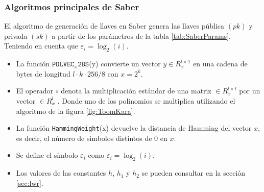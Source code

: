 \subsubsection{Algoritmos principales de Saber \cite{saber-spec-2020} }
 El algoritmo de generación de llaves en Saber genera las llaves pública \((pk)\) y privada \((sk)\) a partir de los parámetros de la tabla \ref{tab:SaberParams}. Teniendo en cuenta que \(\varepsilon_i=\log_2 (i)\).
 \begin{itemize}
 	\item La función $\texttt{POLVEC}_x\texttt{2BS}$(y) convierte un vector \(y\in R_x^{l\times 1}\) en una cadena de bytes de longitud \(l\cdot k \cdot 256/8\) con \(x=2^k\).
 	\item El operador \(\circ\) denota la multiplicación estándar de una matriz \(\in R_x^{l\times l}\) por un vector \(\in R_x^{l}\) . Donde uno de los polinomios se multiplica utilizando el algoritmo de la figura \ref{fig:ToomKara}.
 	\item La función \texttt{HammingWeight}(x) devuelve la distancia de Hamming del vector \(x\), es decir, el número de simbolos distintos de \(0\) en \(x\).
 	\item Se define el símbolo $\varepsilon_i$ como \(\varepsilon_i=\log_2 (i)\).
 	\item Los valores de las constantes \(h\), \(h_1\) y \(h_2\) se pueden consultar en la sección \ref{sec:lwr}.
 \end{itemize}
 \newpage
